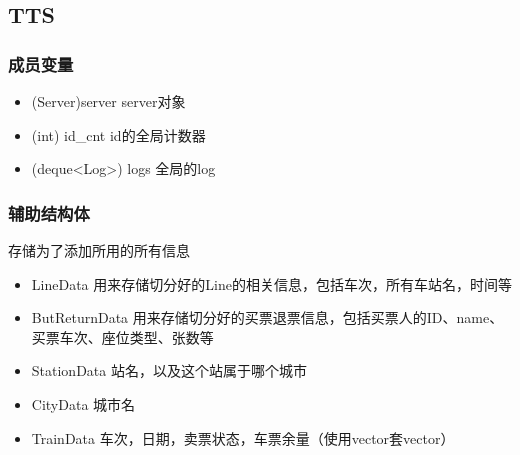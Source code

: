 \subsection{TTS}
    \subsubsection{成员变量}
    \begin{itemize}
    \item (Server)server
    server对象
    \item (int) id_cnt
    id的全局计数器
    \item (deque<Log>) logs
    全局的log
    \end{itemize}
    
    \subsubsection{辅助结构体}
    存储为了添加所用的所有信息
    \begin{itemize}
    \item {LineData}
        用来存储切分好的Line的相关信息，包括车次，所有车站名，时间等
    \item {ButReturnData}
        用来存储切分好的买票退票信息，包括买票人的ID、name、买票车次、座位类型、张数等
    \item {StationData}
        站名，以及这个站属于哪个城市
    \item {CityData}
        城市名
    \item {TrainData}
        车次，日期，卖票状态，车票余量（使用vector套vector）
    \end{itemize}

